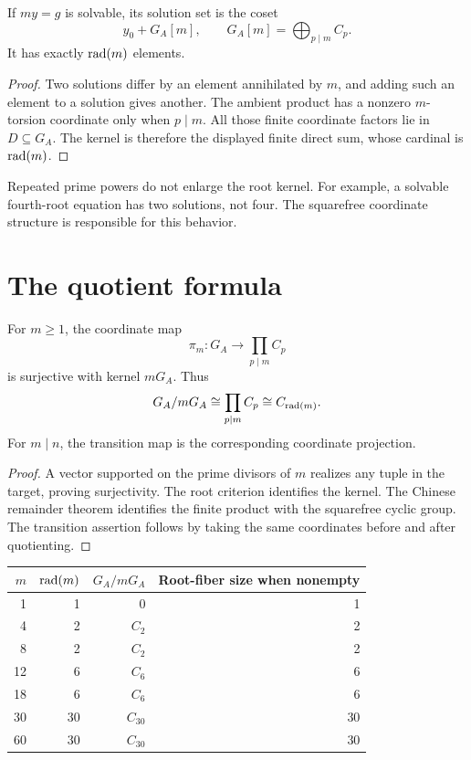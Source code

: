 \begin{proposition}
\label{thm:rootfiber}
If $my=g$ is solvable, its solution set is the coset
\[
y_0+G_A[m],\qquad
G_A[m]=\bigoplus_{p\mid m}C_p.
\]
It has exactly $\operatorname{rad}(m)$ elements.
\end{proposition}
\begin{proof}
Two solutions differ by an element annihilated by $m$, and adding such an element to a solution gives another. The ambient product has a nonzero $m$-torsion coordinate only when $p\mid m$. All those finite coordinate factors lie in $D\subseteq G_A$. The kernel is therefore the displayed finite direct sum, whose cardinal is $\operatorname{rad}(m)$.
\end{proof}
Repeated prime powers do not enlarge the root kernel. For example, a solvable fourth-root equation has two solutions, not four. The squarefree coordinate structure is responsible for this behavior.

\section{The quotient formula}
\begin{theorem}
\label{thm:quotientformula}
For $m\ge1$, the coordinate map
\[
\pi_m:G_A\longrightarrow\prod_{p\mid m}C_p
\]
is surjective with kernel $mG_A$. Thus
\[
G_A/mG_A\cong\prod_{p\mid m}C_p\cong C_{\operatorname{rad}(m)}.
\]
For $m\mid n$, the transition map is the corresponding coordinate projection.
\end{theorem}
\begin{proof}
A vector supported on the prime divisors of $m$ realizes any tuple in the target, proving surjectivity. The root criterion identifies the kernel. The Chinese remainder theorem identifies the finite product with the squarefree cyclic group. The transition assertion follows by taking the same coordinates before and after quotienting.
\end{proof}

\begin{center}
\begin{tabular}{@{}rrrr@{}}
\toprule
$m$&$\operatorname{rad}(m)$&$G_A/mG_A$&Root-fiber size when nonempty\\\midrule
1&1&$0$&1\\
4&2&$C_2$&2\\
8&2&$C_2$&2\\
12&6&$C_6$&6\\
18&6&$C_6$&6\\
30&30&$C_{30}$&30\\
60&30&$C_{30}$&30\\\bottomrule
\end{tabular}
\end{center}


